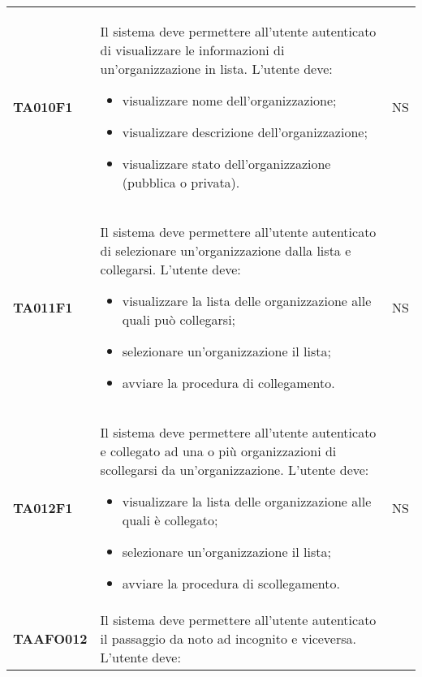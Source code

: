 \documentclass[../piano-di-qualifica.tex]{subfiles}
\begin{document}
\begin{centering}
\begin{longtable}[H]{>{\centering\bfseries}m{3cm} >{}p{10cm} >{\centering\arraybackslash}m{3cm}}
       TA010F1      & Il sistema deve permettere all'utente autenticato di visualizzare le informazioni di un'organizzazione in lista. \newline
                    L'utente deve:
                    \begin{itemize}
                      \item visualizzare nome dell'organizzazione;
                      \item visualizzare descrizione dell'organizzazione;
                      \item visualizzare stato dell'organizzazione (pubblica o privata).
                    \end{itemize}
                  & NS \\
       TA011F1      & Il sistema deve permettere all'utente autenticato di selezionare un'organizzazione dalla lista e collegarsi. \newline
                        L'utente deve:
                        \begin{itemize}
                          \item visualizzare la lista delle organizzazione alle quali può collegarsi;
                          \item selezionare un'organizzazione il lista;
                          \item avviare la procedura di collegamento.
                        \end{itemize}
                      & NS \\
       TA012F1      & Il sistema deve permettere all'utente autenticato e collegato ad una o più organizzazioni di scollegarsi da un'organizzazione. \newline
                        L'utente deve:
                        \begin{itemize}
                          \item visualizzare la lista delle organizzazione alle quali è collegato;
                          \item selezionare un'organizzazione il lista;
                          \item avviare la procedura di scollegamento.
                        \end{itemize}
                      & NS \\
        TAAFO012      & Il sistema deve permettere all'utente autenticato il passaggio da noto ad incognito e viceversa. \newline
                      L'utente deve:

\end{longtable}
\end{centering}
\end{document}
